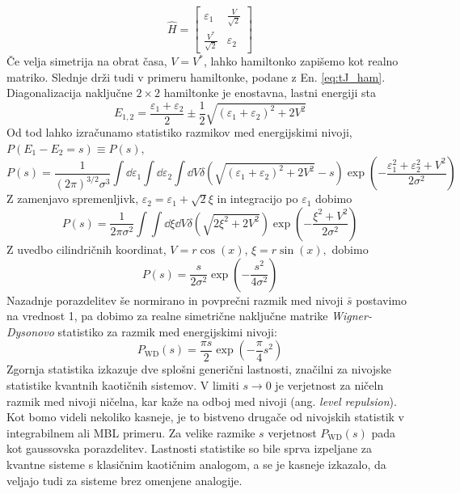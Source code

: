 { \begin{equation}\label{eq:rnd_ham}
 \hat{H}=
 \begin{bmatrix}
 \varepsilon_1 & \frac{V}{\sqrt{2}} \\
 \frac{V^*}{\sqrt{2}} & \varepsilon_2
 \end{bmatrix}
 \end{equation}
 Če velja simetrija na obrat časa, $V=V^*$, lahko hamiltonko zapišemo kot realno matriko. Slednje drži tudi v primeru hamiltonke, podane z En. \eqref{eq:tJ_ham}. Diagonalizacija naključne $2\times2$ hamiltonke je enostavna, lastni energiji sta
 \begin{equation}
 E_{1,2}=\frac{\varepsilon_1+\varepsilon_2}{2}\pm \frac{1}{2}\sqrt{\left(\varepsilon_1 +\varepsilon_2\right)^2 + 2V^2}
 \end{equation}
 Od tod lahko izračunamo statistiko razmikov med energijskimi nivoji, $P(E_1-E_2=s)\equiv P(s),$
\begin{equation}
 P(s)=\frac{1}{\left(2\pi\right)^{3/2}\sigma^3}\int \dd\varepsilon_1\int\dd\varepsilon_2\int \dd V \delta\left(\sqrt{\left(\varepsilon_1 +\varepsilon_2\right)^2 + 2V^2}-s\right)\exp\left( -\frac{\varepsilon_1^2+\varepsilon_2^2+V^2}{2\sigma^2}\right)
 \end{equation}
 Z zamenjavo spremenljivk, $\varepsilon_2=\varepsilon_1+\sqrt{2}\xi$ in integracijo po $\varepsilon_1$ dobimo 
 \begin{equation}
 P(s)=\frac{1}{2\pi\sigma^2}\int\int\dd\xi\dd V\delta\left(\sqrt{2\xi^2+2V^2}\right)\exp\left(-\frac{\xi^2+V^2}{2\sigma^2}\right)
 \end{equation}
 Z uvedbo cilindričnih koordinat, $V=r\cos(x)$, $\xi=r\sin(x),$ dobimo 
 \begin{equation}\label{eq:wigner_surmise}
 P(s)=\frac{s}{2\sigma^2}\exp\left(-\frac{s^2}{4\sigma^2} \right)
\end{equation}
 Nazadnje porazdelitev še normirano in povprečni razmik med nivoji $\bar{s}$ postavimo na vrednost 1, pa dobimo za realne simetrične naključne matrike \emph{Wigner-Dysonovo} statistiko za razmik med energijskimi nivoji: 
 \begin{equation}\label{eq:wigner-dyson}
 P_\mathrm{WD}(s)=\frac{\pi s}{2}\exp\left(-\frac{\pi}{4}s^2\right)
 \end{equation}
 Zgornja statistika izkazuje dve splošni generični lastnosti, značilni za nivojske statistike kvantnih kaotičnih sistemov. V limiti $s\to 0$ je verjetnost za ničeln razmik med nivoji ničelna, kar kaže na odboj med nivoji (ang. \emph{level repulsion}). Kot bomo videli nekoliko kasneje, je to bistveno drugače od nivojskih statistik v integrabilnem ali MBL primeru. Za velike razmike $s$ verjetnost $P_\mathrm{WD}(s)$ pada kot gaussovska porazdelitev. Lastnosti statistike so bile sprva izpeljane za kvantne sisteme s klasičnim kaotičnim analogom, a se je kasneje izkazalo, da veljajo tudi za sisteme brez omenjene analogije.\\\\
}
